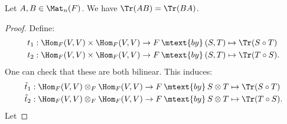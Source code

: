     \begin{corollary}
        Let $A,B \in \Mat_n(F)$. We have $\Tr(AB) = \Tr(BA)$.
    \end{corollary}
        \begin{proof}
            Define:
                \begin{equation*}
                \begin{split}
                    t_1: \Hom_F(V,V) \times \Hom_F(V,V) &\rightarrow F \hspace{2pt}\mtext{by}\hspace{2pt} (S,T) \mapsto \Tr(S \circ T) \\
                    t_2: \Hom_F(V,V) \times \Hom_F(V,V) &\rightarrow F \hspace{2pt}\mtext{by}\hspace{2pt} (S,T) \mapsto \Tr(T \circ S).
                \end{split}
                \end{equation*}
            One can check that these are both bilinear. This induces:
                \begin{equation*}
                \begin{split}
                    \tilde{t}_1: \Hom_F(V,V) \otimes_F \Hom_F(V,V) &\rightarrow F \hspace{2pt}\mtext{by}\hspace{2pt} S \otimes T \mapsto \Tr(S \circ T) \\
                    \tilde{t}_2: \Hom_F(V,V) \otimes_F \Hom_F(V,V) &\rightarrow F \hspace{2pt}\mtext{by}\hspace{2pt} S \otimes T \mapsto \Tr(T \circ S).
                \end{split}
                \end{equation*}
            Let 
        \end{proof}
